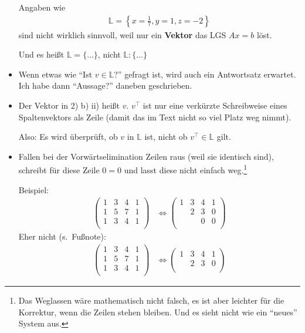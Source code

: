 \documentclass[11pt, a4paper]{article}
\newcommand{\Lsg}{\mathbb{L}}
\begin{document}
\begin{itemize}
Angaben wie 
\begin{align*}
\Lsg = \left\{x = \frac{1}{7}, y = 1, z = -2\right\} 
\end{align*}
sind nicht wirklich sinnvoll, weil nur ein \textbf{Vektor} das LGS $Ax = b$ löst.

 
Und es heißt $\Lsg = \{\dots\}$, nicht $\Lsg : \{\dots\}$
\item Wenn etwas wie \enquote{Ist $v \in \Lsg$?} gefragt ist, wird auch ein Antwortsatz erwartet. Ich habe dann \enquote{Aussage?} daneben geschrieben.

\item Der Vektor in 2) b) ii) heißt $v$. $v^\intercal$ ist nur eine verkürzte Schreibweise eines Spaltenvektors als Zeile (damit das im Text nicht so viel Platz weg nimmt). 

Also: Es wird überprüft, ob $v$ in $\Lsg$ ist, nicht ob $v^\intercal \in \Lsg$ gilt.

\item Fallen bei der Vorwärtselimination Zeilen raus (weil sie identisch sind), schreibt für diese Zeile $0 = 0$ und lasst diese nicht einfach weg.\footnote{Das Weglassen wäre mathematisch nicht falsch, es ist aber leichter für die Korrektur, wenn die Zeilen stehen bleiben. Und es sieht nicht wie ein \enquote{neues} System aus. \smiley{}} 

Beispiel:
\begin{align*}
\left(
\begin{array}{ccc|c}
1 & 3 & 4 & 1\\
1 & 5 & 7 & 1\\
1 & 3 & 4 & 1\\
\end{array}
\right)
&
\Leftrightarrow
\left(
\begin{array}{ccc|c}
1 & 3 & 4 & 1\\
  & 2 & 3 & 0\\
  &   & 0 & 0\\
\end{array}
\right)
\end{align*}
Eher nicht (s.\, Fußnote): 
\begin{align*}
\left(
\begin{array}{ccc|c}
1 & 3 & 4 & 1\\
1 & 5 & 7 & 1\\
1 & 3 & 4 & 1\\
\end{array}
\right)
&
\Leftrightarrow
\left(
\begin{array}{ccc|c}
1 & 3 & 4 & 1\\
  & 2 & 3 & 0\\
\end{array}
\right)
\end{align*}


\end{itemize}
\end{document}
